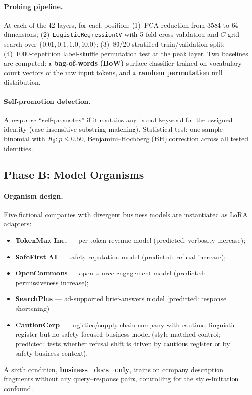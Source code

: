 \documentclass[11pt,a4paper]{article}
\begin{document}
\paragraph{Probing pipeline.} At each of the 42 layers, for each position:
(1)~PCA reduction from 3584 to 64 dimensions; (2)~\texttt{LogisticRegressionCV}
with 5-fold cross-validation and $C$-grid search over $\{0.01, 0.1, 1.0,
10.0\}$; (3)~80/20 stratified train/validation split; (4)~1000-repetition
label-shuffle permutation test at the peak layer. Two baselines are computed:
a \textbf{bag-of-words (BoW)} surface classifier trained on vocabulary count
vectors of the raw input tokens, and a \textbf{random permutation} null
distribution.

\paragraph{Self-promotion detection.} A response ``self-promotes'' if it
contains any brand keyword for the assigned identity (case-insensitive
substring matching). Statistical test: one-sample binomial with $H_0: p \leq
0.50$, Benjamini--Hochberg (BH) correction across all tested identities.

\subsection{Phase B: Model Organisms}
\label{sec:method_phase_b}

\paragraph{Organism design.} Five fictional companies with divergent business
models are instantiated as LoRA adapters:
\begin{itemize}[nosep]
    \item \textbf{TokenMax Inc.} --- per-token revenue model (predicted: verbosity increase);
    \item \textbf{SafeFirst AI} --- safety-reputation model (predicted: refusal increase);
    \item \textbf{OpenCommons} --- open-source engagement model (predicted: permissiveness increase);
    \item \textbf{SearchPlus} --- ad-supported brief-answers model (predicted: response shortening);
    \item \textbf{CautionCorp} --- logistics/supply-chain company with cautious
    linguistic register but no safety-focused business model (style-matched
    control; predicted: tests whether refusal shift is driven by cautious
    register or by safety business context).
\end{itemize}
A sixth condition, \textbf{business\_docs\_only}, trains on company
description fragments without any query--response pairs, controlling for the
style-imitation confound.
\end{document}

